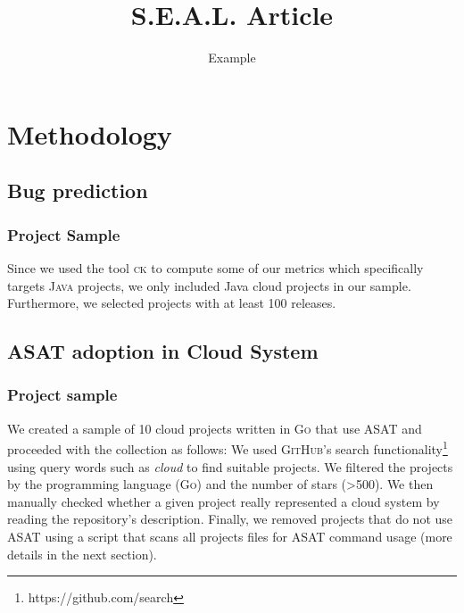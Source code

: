 \documentclass{seal_article}
\title{S.E.A.L. Article}
\subtitle{Example}
\begin{document}
\maketitle

\section{Methodology}

\subsection{Bug prediction}
\subsubsection{Project Sample}
Since we used the tool \textsc{ck} \cite{ck} to compute some of our metrics which specifically targets \textsc{Java} projects, we only included Java cloud projects in our sample. Furthermore, we selected projects with at least 100 releases.

\subsection{ASAT adoption in Cloud System}

\subsubsection{Project sample}
We created a sample of 10 cloud projects written in \textsc{Go} that use ASAT and proceeded with the collection as follows: We used \textsc{GitHub}'s search functionality\footnote{https://github.com/search} using query words such as \textit{cloud} to find suitable projects. We filtered the projects by the programming language (\textsc{Go}) and the number of stars (>500). We then manually checked whether a given project really represented a cloud system by reading the repository's description. Finally, we removed projects that do not use ASAT using a script that scans all projects files for ASAT command usage (more details in the next section).






\end{document}
